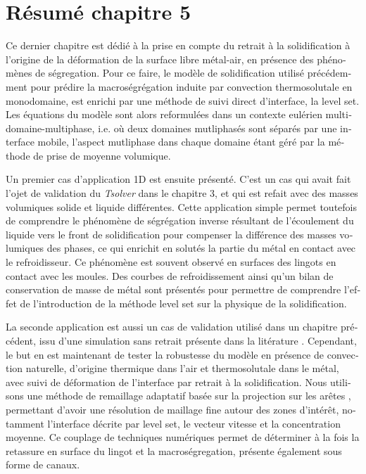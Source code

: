 \clearpage
\section*{Résumé chapitre 5}

\begin{otherlanguage}{french}
{\small

Ce dernier chapitre est dédié à la prise en compte du retrait à la solidification à l'origine de la 
déformation de la surface libre métal-air, en présence des phénomènes de ségregation.
Pour ce faire, le modèle de solidification utilisé précédemment pour prédire la macroségrégation induite 
par convection thermosolutale en monodomaine, est enrichi par une méthode de suivi direct d'interface, la level set. %
Les équations du modèle sont alors reformulées dans un contexte 
eulérien multidomaine-multiphase, i.e. où deux domaines mutliphasés sont séparés
par une interface mobile, l'aspect mutliphase dans chaque domaine étant géré par la méthode de prise de moyenne volumique. 


Un premier cas d'application 1D est ensuite présenté. C'est un cas qui avait fait l'ojet de validation du \emph{Tsolver} dans le chapitre 3,
et qui est refait avec des masses volumiques solide et liquide différentes. Cette application simple permet toutefois de comprendre le phénomène
de ségrégation inverse résultant de l'écoulement du liquide vers le front de solidification pour compenser la différence
des masses volumiques des phases, ce qui enrichit en solutés la partie du métal en contact avec le refroidisseur. 
Ce phénomène est souvent observé en surfaces des lingots en contact avec les moules. Des courbes de refroidissement ainsi qu'un bilan de conservation de masse de métal sont
présentés pour permettre de comprendre l'effet de l'introduction de la méthode level set sur la physique de la solidification.


La seconde application est aussi un cas de validation utilisé dans un chapitre précédent, issu d'une simulation sans retrait présente dans la litérature \citep{carozzani_direct_2013}.
Cependant, le but en est maintenant de tester la robustesse du modèle
en présence de convection naturelle, d'origine thermique dans l'air et thermosolutale dans le métal, avec suivi de déformation de l'interface par retrait à la solidification.
Nous utilisons une méthode de remaillage adaptatif basée sur la projection sur les arêtes \citep{coupez_solution_2013}, 
permettant d'avoir une résolution de maillage fine autour des zones d'intérêt, notamment l'interface décrite par level set, le vecteur vitesse
et la concentration moyenne. Ce couplage de techniques numériques permet de déterminer à la fois la retassure en surface du lingot et la macroségregation,
présente également sous forme de canaux.


}
\end{otherlanguage}
